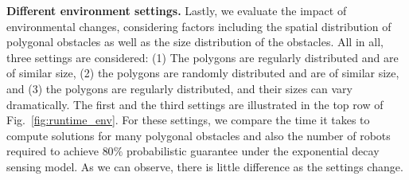 \textbf{Different environment settings.}
Lastly, we evaluate the impact of environmental changes, considering factors including the spatial distribution of polygonal obstacles as well as 
the size distribution of the obstacles. 
%
All in all, three settings are considered: (1) The polygons are regularly distributed 
and are of similar size, (2) the polygons are randomly distributed and are of similar size,
and (3) the polygons are regularly distributed, and their sizes can vary dramatically. 
The first and the third settings are illustrated in the top row of Fig.~\ref{fig:runtime_env}.
%
For these settings, we compare the time it takes to compute solutions for many polygonal
obstacles and also the number of robots required to achieve $80\%$ probabilistic guarantee 
under the exponential decay sensing model.
%
As we can observe, there is little difference as the settings change. 

